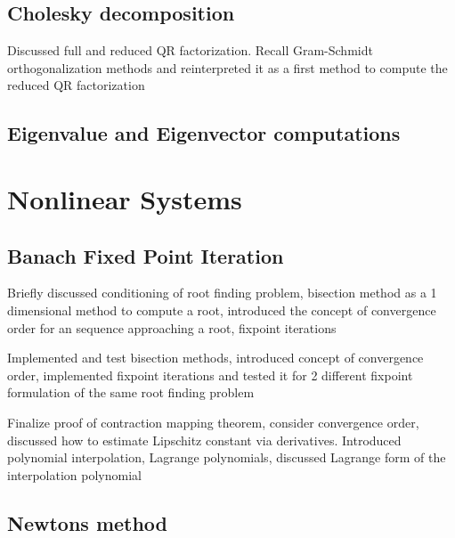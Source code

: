 \documentclass{article}
\theoremstyle{remark}
\begin{document}
\subsection{Cholesky decomposition}%
\label{sub:chelesky_decomposition}
\begin{tcolorbox}
  Discussed full and reduced QR factorization. Recall Gram-Schmidt orthogonalization methods and reinterpreted it as a first method to compute the reduced QR factorization	
\end{tcolorbox}

\subsection{Eigenvalue and Eigenvector computations}%
\label{sub:eigenvalue_and_eigenvector_computations}

\newpage
\section{Nonlinear Systems}%
\label{sec:nonlinear_systems}

\subsection{Banach Fixed Point Iteration}%
\label{sub:banach_fixed_point_iteration}
\begin{tcolorbox}
  Briefly discussed conditioning of root finding problem, bisection method as a 1 dimensional method to compute a root, introduced the concept of convergence order for an sequence approaching a root, fixpoint iterations

\end{tcolorbox}

\begin{tcolorbox}
  Implemented and test bisection methods, introduced concept of convergence order, implemented fixpoint iterations and tested it for 2 different fixpoint formulation of the same root finding problem 
\end{tcolorbox}

\begin{tcolorbox}
  Finalize proof of contraction mapping theorem, consider convergence order, discussed how to estimate Lipschitz constant via derivatives. Introduced polynomial interpolation, Lagrange polynomials, discussed Lagrange form of the interpolation polynomial	
\end{tcolorbox}
\subsection{Newtons method}%
\label{sub:newtons_method}
\end{document}
